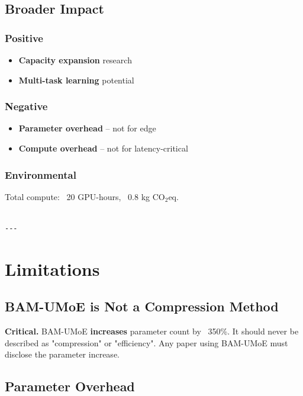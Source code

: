 \subsection{Broader Impact}

\subsubsection{Positive}
\begin{itemize}
\item \textbf{Capacity expansion} research
\item \textbf{Multi-task learning} potential

\end{itemize}
\subsubsection{Negative}
\begin{itemize}
\item \textbf{Parameter overhead} -- not for edge
\item \textbf{Compute overhead} -- not for latency-critical

\end{itemize}
\subsubsection{Environmental}
Total compute: ~20 GPU-hours, ~0.8 kg CO$_2$eq.
\begin{lstlisting}

---
\end{lstlisting}

\section{Limitations}

\subsection{BAM-UMoE is Not a Compression Method}

\textbf{Critical.} BAM-UMoE \textbf{increases} parameter count by ~350\%. 
It should never be described as "compression" or "efficiency". Any paper 
using BAM-UMoE must disclose the parameter increase.

\subsection{Parameter Overhead}

